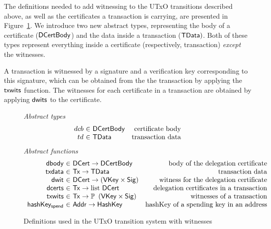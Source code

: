 \documentclass[11pt,a4paper,dvipsnames]{article}
\newcommand{\Tx}{\type{Tx}}
\newcommand{\Addr}{\type{Addr}}
\newcommand{\DCert}{\type{DCert}}
\newcommand{\DCertBody}{\type{DCertBody}}
\newcommand{\TData}{\type{TData}}
\newcommand{\VKey}{\type{VKey}}
\newcommand{\HashKey}{\type{HashKey}}
\newcommand{\Sig}{\type{Sig}}
\theoremstyle{definition}
\theoremstyle{definition}
\begin{document}
The definitions needed to add witnessing to the UTxO transitions described above,
as well as the certificates a transaction is carrying,
are presented in Figure~\ref{fig:defs:utxow}. We introduce two new abstract types,
representing the body of a certificate ($\DCertBody$) and the data inside a
transaction ($\TData)$. Both of these types represent everything inside a
certificate (respectively, transaction) \textit{except} the witnesses.

A transaction is witnessed by
a signature and a verification key corresponding to this signature, which can
be obtained from the the transaction by applying the $\mathsf{txwits}$ function.
The witnesses for each certificate in a transaction are obtained by applying $\mathsf{dwits}$
to the certificate.

\begin{figure}
  \emph{Abstract types}
  \begin{equation*}
    \begin{array}{r@{~\in~}lr}
      dcb & \DCertBody & \text{certificate body}\\
      td & \TData
      & \text{transaction data} \\
    \end{array}
  \end{equation*}
  \emph{Abstract functions}
  \begin{equation*}
    \begin{array}{r@{~\in~}lr}
      \fun{dbody} & \DCert \to \DCertBody
      & \text{body of the delegation certificate}\\
      \fun{txdata} & \Tx \to \TData
      & \text{transaction data}\\
      \fun{dwit} & \DCert \to (\VKey \times \Sig)
      & \text{witness for the delegation certificate}\\
      \fun{dcerts} & \Tx \to \text{list}~\DCert
      & \text{delegation certificates in a transaction}\\
      \fun{txwits} & \Tx \to \powerset{\left(\VKey \times \Sig\right)}
      & \text{witnesses of a transaction}\\
      \fun{hashKey_{spend}} & \Addr \to \HashKey
      & \text{hashKey of a spending key in an address}\\
    \end{array}
  \end{equation*}
  \caption{Definitions used in the UTxO transition system with witnesses}
  \label{fig:defs:utxow}
\end{figure}
\end{document}
